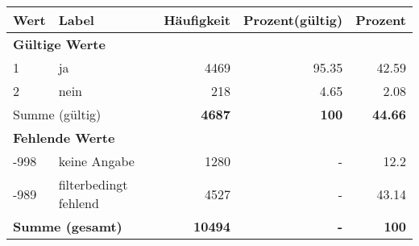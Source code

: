      \begin{longtable}{lXrrr}
     \toprule
     \textbf{Wert} & \textbf{Label} & \textbf{Häufigkeit} & \textbf{Prozent(gültig)} & \textbf{Prozent} \\
     \endhead
     \midrule
     \multicolumn{5}{l}{\textbf{Gültige Werte}}\\

     1 &
     \multicolumn{1}{X}{ ja   } &


       \num{4469} &
       \num[round-mode=places,round-precision=2]{95,35} &
         \num[round-mode=places,round-precision=2]{42,59} \\

     2 &
     \multicolumn{1}{X}{ nein   } &


       \num{218} &
       \num[round-mode=places,round-precision=2]{4,65} &
         \num[round-mode=places,round-precision=2]{2,08} \\
     \midrule
     \multicolumn{2}{l}{Summe (gültig)} &
       \textbf{\num{4687}} &
     \textbf{100} &
       \textbf{\num[round-mode=places,round-precision=2]{44,66}} \\
     \multicolumn{5}{l}{\textbf{Fehlende Werte}}\\
       -998 &
       keine Angabe &
         \num{1280} &
        - &
         \num[round-mode=places,round-precision=2]{12,2} \\
       -989 &
       filterbedingt fehlend &
         \num{4527} &
        - &
         \num[round-mode=places,round-precision=2]{43,14} \\
     \midrule
     \multicolumn{2}{l}{\textbf{Summe (gesamt)}} &
          \textbf{\num{10494}} &
        \textbf{-} &
        \textbf{100} \\
     \bottomrule
     \end{longtable}
     
